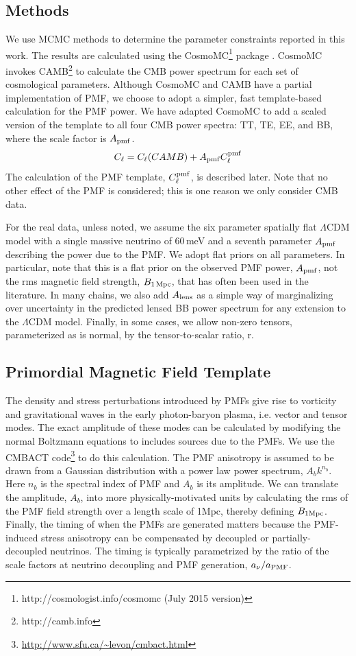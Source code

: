\documentclass[preprint]{emulateapj}
\newcommand{\cpmf}{\ensuremath{C_{\ell}^{\rm pmf}}}
\newcommand{\apmf}{\ensuremath{A_{\rm pmf}}}
\newcommand{\bpmf}{\ensuremath{B_{\rm 1\,Mpc}}}
\newcommand{\alens}{\ensuremath{A_{\rm lens}}}
\newcommand{\lcdm}{\ensuremath{\Lambda}CDM}
\newcommand{\be}{\begin{equation}}
\newcommand{\ee}{\end{equation}}
\begin{document}
\subsection{Methods}

We use MCMC methods to determine the parameter constraints reported in this work. 
The results are calculated using  the {\textsc CosmoMC}\footnote{http://cosmologist.info/cosmomc (July 2015 version)} package \citep{lewis02b}. 
CosmoMC invokes  CAMB\footnote{http://camb.info}  \citep{lewis00} to calculate the CMB power spectrum for each set of cosmological parameters. 
Although CosmoMC and CAMB have a partial implementation of PMF, we choose to adopt a simpler, fast template-based calculation for the PMF power. 
We have adapted CosmoMC to add a scaled version of the template to all four CMB power spectra: TT, TE, EE, and BB, where the scale factor is \apmf. 
\be
C_\ell = C_\ell (CAMB) + \apmf \cpmf
\ee
The calculation of the PMF template, \cpmf, is described later. 
Note that no other effect of the PMF is considered; this is one reason we only consider CMB data.

For the real data, unless noted, we assume the six parameter spatially flat \lcdm{} model with a single massive neutrino of 60\,meV and a seventh parameter \apmf{} describing the power due to the PMF. 
We adopt flat priors on all parameters. 
In particular, note that this is a flat prior on the observed PMF power, $\apmf$, not the rms magnetic field strength, \bpmf, that has often been used in the literature. 
In many chains, we also add \alens{} as a simple way of marginalizing over uncertainty in the predicted lensed BB power spectrum for any extension to the \lcdm{} model. 
Finally, in some cases, we allow non-zero tensors, parameterized as is normal, by the tensor-to-scalar ratio, r. 

\subsection{Primordial Magnetic Field Template}


The density and stress perturbations introduced by PMFs give rise to vorticity and gravitational waves in the early photon-baryon  plasma, i.e. vector and tensor modes. 
The exact amplitude of these modes can be calculated by modifying the normal Boltzmann equations to includes sources due to the PMFs. 
We use the CMBACT code\footnote{\url{http://www.sfu.ca/~levon/cmbact.html}} \citep{pogosian99}  to do this calculation. 
The PMF anisotropy is assumed to be drawn from a Gaussian distribution with a power law power spectrum, $A_b k^{n_b}$. 
Here $n_b$ is the spectral index of PMF and $A_b$ is its amplitude. 
We can translate the amplitude, $A_b$, into more physically-motivated units by calculating the rms of the PMF field strength over a length scale of 1\rm{Mpc}, thereby defining $B_{\rm{1Mpc}}$. 
Finally, the timing of when the PMFs are generated matters because the PMF-induced stress anisotropy can be compensated by decoupled or partially-decoupled neutrinos. 
The timing is typically parametrized by the ratio of the scale factors at neutrino decoupling and PMF generation, $a_{\nu}/a_{\rm{PMF}}$. 
\end{document}

